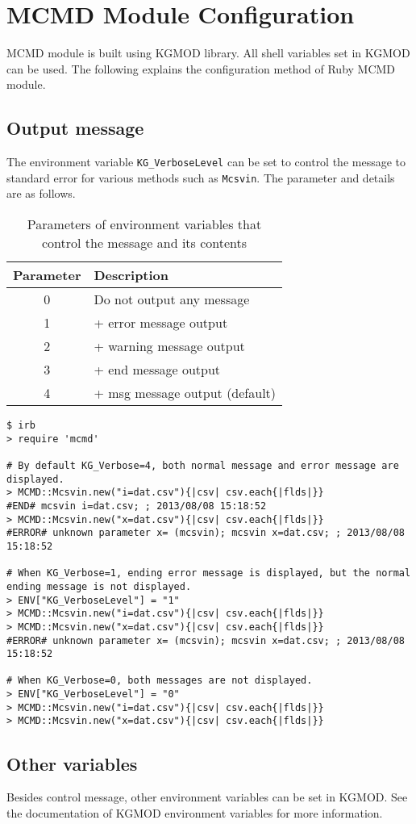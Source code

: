 
%

\section{MCMD Module Configuration \label{sect:evnRB}}
MCMD module is built using KGMOD library. All shell variables set in KGMOD can be used. The following explains the configuration method of Ruby MCMD module.


\subsection{Output message}

The environment variable \verb|KG_VerboseLevel| can be set to control the message to standard error for various methods such as \verb|Mcsvin|. The parameter and details are as follows.


\begin{table}[htpb]
\begin{center}
\caption{Parameters of environment variables that control the message and its contents\label{tb:bench1}}
\begin{tabular}{c|l}
\hline
Parameter  & Description\\ \hline
0 & Do not output any message \\
1 & + error message output \\
2 & + warning message output\\
3 & + end message output \\
4 & + msg message output (default) \\
\hline
\end{tabular}  
\end{center}
\end{table}  

\begin{Verbatim}[baselinestretch=0.7,frame=single]
$ irb
> require 'mcmd'

# By default KG_Verbose=4, both normal message and error message are displayed. 
> MCMD::Mcsvin.new("i=dat.csv"){|csv| csv.each{|flds|}}
#END# mcsvin i=dat.csv; ; 2013/08/08 15:18:52
> MCMD::Mcsvin.new("x=dat.csv"){|csv| csv.each{|flds|}}
#ERROR# unknown parameter x= (mcsvin); mcsvin x=dat.csv; ; 2013/08/08 15:18:52

# When KG_Verbose=1, ending error message is displayed, but the normal ending message is not displayed. 
> ENV["KG_VerboseLevel"] = "1"
> MCMD::Mcsvin.new("i=dat.csv"){|csv| csv.each{|flds|}}
> MCMD::Mcsvin.new("x=dat.csv"){|csv| csv.each{|flds|}}
#ERROR# unknown parameter x= (mcsvin); mcsvin x=dat.csv; ; 2013/08/08 15:18:52

# When KG_Verbose=0, both messages are not displayed.
> ENV["KG_VerboseLevel"] = "0"
> MCMD::Mcsvin.new("i=dat.csv"){|csv| csv.each{|flds|}}
> MCMD::Mcsvin.new("x=dat.csv"){|csv| csv.each{|flds|}}
\end{Verbatim}



\subsection{Other variables}
Besides control message, other environment variables can be set in KGMOD.
See the documentation of KGMOD environment variables for more information.




